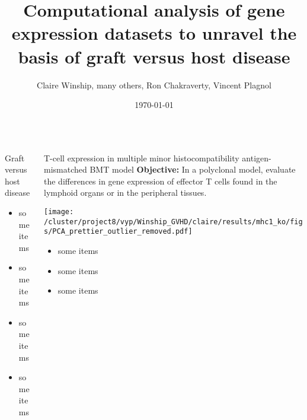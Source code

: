\documentclass[final,hyperref={pdfpagelabels=false}]{beamer}
\title[GVHD]{Computational analysis of gene expression datasets to unravel the basis of graft versus host disease}
\author[Winship \& Plagnol]{Claire Winship, many others, Ron Chakraverty, Vincent Plagnol}
\institute[UGI]{UCL Genetics Institute}
\date{\today}
\begin{document}
  \begin{frame}{} 

  \begin{beamercolorbox}{}
    \maketitle
  \end{beamercolorbox}


    \vfill
    \begin{columns}[t]

      \begin{column}{.25\linewidth}
        \begin{block}{Graft versus host disease}
          \begin{itemize}
          \item some items
          \item some items
          \item some items
          \item some items
          \end{itemize}
        \end{block}
      \end{column}


      \begin{column}{.24\linewidth}
        \begin{block}{T-cell expression in multiple minor histocompatibility antigen-mismatched BMT model}
	  {\bf Objective:} In a polyclonal model, evaluate the differences in gene expression of effector T cells found in the lymphoid organs or in the peripheral tissues.
	  \begin{center}
	    \texttt{[image: /cluster/project8/vyp/Winship\_GVHD/claire/results/mhc1\_ko/figs/PCA\_prettier\_outlier\_removed.pdf]}
	    \end{center} %
          \begin{itemize}
          \item some items
          \item some items
          \item some items
          \end{itemize}
        \end{block}
      \end{column}




\end{columns}
\end{frame}
\end{document}
